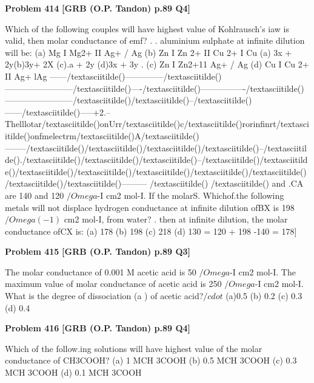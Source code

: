 \begin{problembox}
\textbf{Problem 414} \hfill \textbf{[GRB (O.P. Tandon) p.89 Q4]}
\label{q:ext-grb_all_questions-414}

Which of the following couples will have highest value of 
Kohlrausch's iaw is valid, then molar conductance of 
emf? 
. 
. 
aluminium sulphate at infinite dilution will be: 
(a) Mg I Mg2+ II Ag+ / Ag 
(b) Zn I Zn 2+ II Cu 2+ I Cu 
(a) 3x + 2y(b)3y+ 2X 
(c).a + 2y 
(d)3x + 3y 
. (c) Zn I Zn2+11 Ag+ / Ag 
(d) Cu I Cu 2+ II Ag+ lAg 
------/textasciitilde()--------------/textasciitilde()------------------------/textasciitilde()----/textasciitilde()----------------/textasciitilde()------------------------/textasciitilde()/textasciitilde()--/textasciitilde()------/textasciitilde()-----+2.--Thelllotar/textasciitilde()onUrr/textasciitilde()c/textasciitilde()rorinfinrt/textasciitilde()onfmelectrm/textasciitilde()A/textasciitilde()--------/textasciitilde()/textasciitilde()/textasciitilde()/textasciitilde()--/textasciitilde()./textasciitilde()/textasciitilde()/textasciitilde()--/textasciitilde()/textasciitilde()/textasciitilde()/textasciitilde()/textasciitilde()/textasciitilde()/textasciitilde()/textasciitilde()/textasciitilde()---------
/textasciitilde() 
/textasciitilde() 
and .CA are 140 and 120 $/Omega$-I cm2 mol-I. If the molarS. Whichof.the following metals will not displace hydrogen 
conductance at infinite dilution ofBX is 198 $/Omega(-1)$ cm2 mol-I, 
from water? 
. 
then at infinite dilution, the molar conductance ofCX is: 
(a) 178 
(b) 198 
(c) 218 
(d) 130 
= 120 + 198 -140 = 178]
\end{problembox}

\begin{problembox}
\textbf{Problem 415} \hfill \textbf{[GRB (O.P. Tandon) p.89 Q3]}
\label{q:ext-grb_all_questions-415}

The molar conductance of 0.001 M acetic acid is 50 $/Omega$-I 
cm2 mol-I. The maximum value of molar conductance of 
acetic acid is 250 $/Omega$-I cm2 mol-I. What is the degree of 
dissociation (a ) of acetic acid?$/cdot$ 
(a)0.5 
(b) 0.2 
(c) 0.3 
(d) 0.4
\end{problembox}

\begin{problembox}
\textbf{Problem 416} \hfill \textbf{[GRB (O.P. Tandon) p.89 Q4]}
\label{q:ext-grb_all_questions-416}

Which of the follow.ing solutions will have highest value of 
the molar conductance of CH3COOH? 
(a) 1 MCH 3COOH 
(b) 0.5 MCH 3COOH 
(c) 0.3 MCH 3COOH 
(d) 0.1 MCH 3COOH
\end{problembox}

